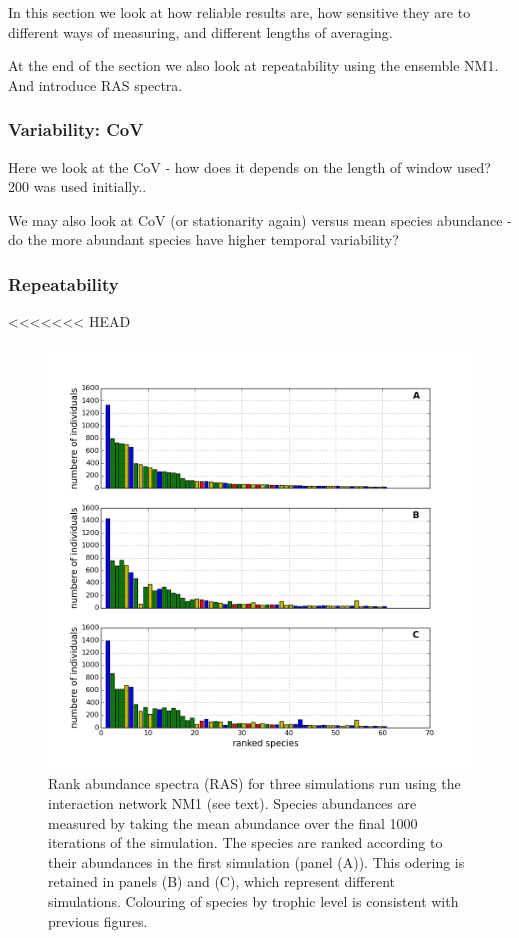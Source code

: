 In this section we look at how reliable results are, how sensitive they are to different ways of measuring, and different lengths of averaging. 

At the end of the section we also look at repeatability using the ensemble NM1. And introduce RAS spectra.

\subsubsection{Variability: CoV}

Here we look at the CoV - how does it depends on the length of window used? 200 was used initially..

We may also look at CoV (or stationarity again) versus mean species abundance - do the more abundant species have higher temporal variability?

\subsubsection{Repeatability}

<<<<<<< HEAD
\begin{figure}[hp]
	\centering
	\includegraphics[width=1.0\linewidth]{"./chapters/chapter04b/figures/ras_3examples"}
    \caption{Rank abundance spectra (RAS) for three simulations run using the interaction network NM1 (see text). Species abundances are measured by taking the mean abundance over the final 1000 iterations of the simulation. The species are ranked according to their abundances in the first simulation (panel (A)). This odering is retained in panels (B) and (C), which represent different simulations. Colouring of species by trophic level is consistent with previous figures.}    
    \label{fig:ras_3examples}
\end{figure}


